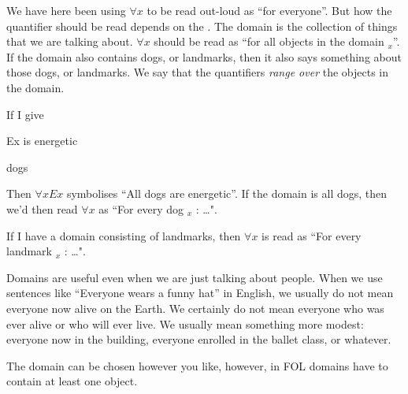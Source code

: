 We have here been using $\forall x$ to be read out-loud as ``for everyone''.
But how the quantifier should be read depends on the . The domain is the collection of things that we are talking about. $\forall x$ should be read as ``for all objects in the domain $_x$''. If the domain also contains dogs, or landmarks, then it also says something about those dogs, or landmarks. We say that the quantifiers \emph{range over} the objects in the domain.

If I give
\begin{ekey}
\item[Ex] is energetic
\item[\text{domain}] dogs
\end{ekey}
Then $\forall x Ex$ symbolises ``All dogs are energetic''. If the domain is all dogs, then we'd then read $\forall x$ as ``For every dog $_x$ : \ldots".

If I have a domain consisting of landmarks, then $\forall x$ is read as ``For every landmark $_x$ : \ldots".

Domains are useful even when we are just talking about people.
When we use sentences like ``Everyone wears a funny hat'' in English, we usually do not mean everyone now alive on the Earth. We certainly do not mean everyone who was ever alive or who will ever live. We usually mean something more modest: everyone now in the building, everyone enrolled in the ballet class, or whatever.



The domain can be chosen however you like, however, in FOL domains have to contain at least one object.

